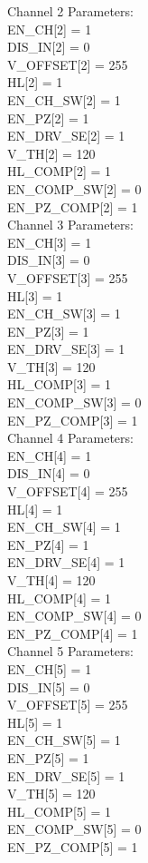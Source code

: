 Channel 2 Parameters:\\

EN\_CH[2]      = 1\\
DIS\_IN[2]     = 0\\
V\_OFFSET[2]   = 255\\
HL[2]         = 1\\
EN\_CH_SW[2]   = 1\\
EN\_PZ[2]      = 1\\
EN\_DRV_SE[2]  = 1\\
V\_TH[2]       = 120\\
HL\_COMP[2]    = 1\\
EN\_COMP_SW[2] = 0\\
EN\_PZ_COMP[2] = 1\\

Channel 3 Parameters:\\

EN\_CH[3]      = 1\\
DIS\_IN[3]     = 0\\
V\_OFFSET[3]   = 255\\
HL[3]         = 1\\
EN\_CH_SW[3]   = 1\\
EN\_PZ[3]      = 1\\
EN\_DRV_SE[3]  = 1\\
V\_TH[3]       = 120\\
HL\_COMP[3]    = 1\\
EN\_COMP_SW[3] = 0\\
EN\_PZ_COMP[3] = 1\\

Channel 4 Parameters:\\

EN\_CH[4]      = 1\\
DIS\_IN[4]     = 0\\
V\_OFFSET[4]   = 255\\
HL[4]         = 1\\
EN\_CH_SW[4]   = 1\\
EN\_PZ[4]      = 1\\
EN\_DRV_SE[4]  = 1\\
V\_TH[4]       = 120\\
HL\_COMP[4]    = 1\\
EN\_COMP_SW[4] = 0\\
EN\_PZ_COMP[4] = 1\\

Channel 5 Parameters:\\

EN\_CH[5]      = 1\\
DIS\_IN[5]     = 0\\
V\_OFFSET[5]   = 255\\
HL[5]         = 1\\
EN\_CH_SW[5]   = 1\\
EN\_PZ[5]      = 1\\
EN\_DRV_SE[5]  = 1\\
V\_TH[5]       = 120\\
HL\_COMP[5]    = 1\\
EN\_COMP_SW[5] = 0\\
EN\_PZ_COMP[5] = 1\\

